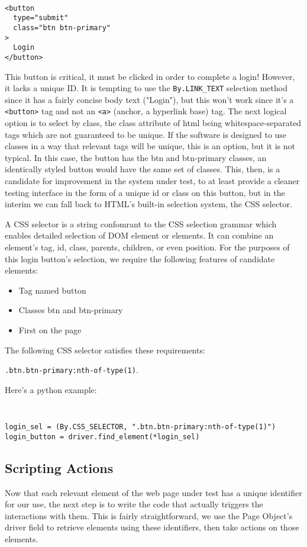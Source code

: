 {\tt
\begin{verbatim}
<button
  type="submit"
  class="btn btn-primary"
>
  Login
</button>
\end{verbatim}
}

This button is critical, it must be clicked in order to complete a login! However, it lacks a unique ID. It is tempting to use the \texttt{By.LINK\_TEXT} selection method since it has a fairly concise body text ("Login"), but this won't work since it's a \texttt{<button>} tag and not an \texttt{<a>} (anchor, a hyperlink base) tag. The next logical option is to select by class, the class attribute of html being whitespace-separated tags which are not guaranteed to be unique. If the software is designed to use classes in a way that relevant tags will be unique, this is an option, but it is not typical. In this case, the button has the btn and btn-primary classes, an identically styled button would have the same set of classes. This, then, is a candidate for improvement in the system under test, to at least provide a cleaner testing interface in the form of a unique id or class on this button, but in the interim we can fall back to HTML's built-in selection system, the CSS selector.

A CSS selector is a string confomrant to the CSS selection grammar \citep{Selector54} which enables detailed selection of DOM element or elements. It can combine an element's tag, id, class, parents, children, or even position. For the purposes of this login button's selection, we require the following features of candidate elements:
\begin{itemize}
\item Tag named button
\item Classes btn and btn-primary
\item First on the page
\end{itemize}

The following CSS selector satisfies these requirements:

\texttt{.btn.btn-primary:nth-of-type(1)}.

Here's a python example:
{\tt
\begin{verbatim}
login_sel = (By.CSS_SELECTOR, ".btn.btn-primary:nth-of-type(1)")
login_button = driver.find_element(*login_sel)
\end{verbatim}
}

\subsection{Scripting Actions}
Now that each relevant element of the web page under test has a unique identifier for our use, the next step is to write the code that actually triggers the interactions with them. This is fairly straightforward, we use the Page Object's driver field to retrieve elements using these identifiers, then take actions on those elements.

